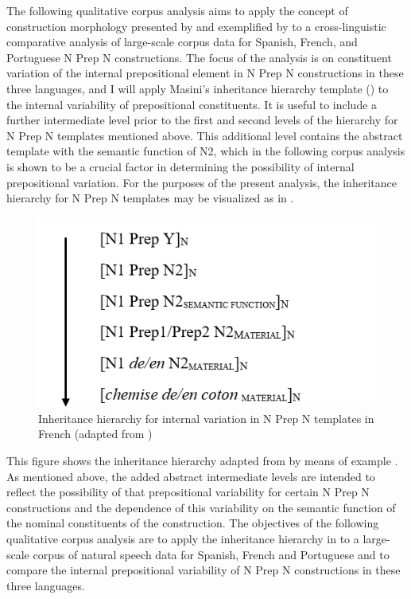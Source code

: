 \documentclass[output=paper]{langsci/langscibook}
\begin{document}
The following qualitative corpus analysis aims to apply the concept of construction morphology presented by \citet{Booij:2010,Booij:2015} and exemplified by \citet{Masini:2009} to a cross-linguistic comparative analysis of large-scale corpus data for Spanish, French, and Portuguese N Prep N constructions. The focus of the analysis is on constituent variation of the internal prepositional element in N Prep N constructions in these three languages, and I will apply Masini's inheritance hierarchy template () to the internal variability of prepositional constituents. It is useful to include a further intermediate level prior to the first and second levels of the hierarchy for N Prep N templates mentioned above. This additional level contains the abstract template with the semantic function of N2, which in the following corpus analysis is shown to be a crucial factor in determining the possibility of internal prepositional variation. For the purposes of the present analysis, the inheritance hierarchy for N Prep N templates may be visualized as in .

\begin{figure}
\caption{Inheritance hierarchy for internal variation in N Prep N templates in French (adapted from \citealt{Masini:2009})\label{fig:henneke:Inheritancehierarchy}}
\includegraphics[scale=0.5]{figures/Inheritancehierarchy.png} 
\end{figure}

This figure shows the inheritance hierarchy adapted from  by means of example . As mentioned above, the added abstract intermediate levels are intended to reflect the possibility of that prepositional variability for certain N Prep N constructions and the dependence of this variability on the semantic function of the nominal constituents of the construction. The objectives of the following qualitative corpus analysis are to apply the inheritance hierarchy in  to a large-scale corpus of natural speech data for Spanish, French and Portuguese and to compare the internal prepositional variability of N Prep N constructions in these three languages.
\end{document}
